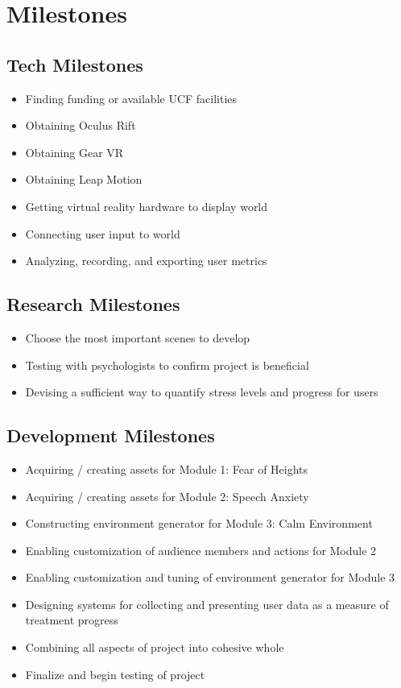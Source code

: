 \documentclass[a4paper,10pt]{article}
\begin{document}
	\pagebreak
	\section{Milestones}
	\subsection{Tech Milestones}
		\begin{itemize}
			\item Finding funding or available UCF facilities
			\item Obtaining Oculus Rift
			\item Obtaining Gear VR
			\item Obtaining Leap Motion
			\item Getting virtual reality hardware to display world
			\item Connecting user input to world
			\item Analyzing, recording, and exporting user metrics
		\end{itemize}
	\subsection{Research Milestones}
		\begin{itemize}
			\item Choose the most important scenes to develop
			\item Testing with psychologists to confirm project is beneficial
			\item Devising a sufficient way to quantify stress levels and progress for users
		\end{itemize}
	\subsection{Development Milestones}
		\begin{itemize}
			\item Acquiring / creating assets for Module 1: Fear of Heights
			\item Acquiring / creating assets for Module 2: Speech Anxiety
			\item Constructing environment generator for Module 3: Calm Environment
			\item Enabling customization of audience members and actions for Module 2
			\item Enabling customization and tuning of environment generator for Module 3
			\item Designing systems for collecting and presenting user data as a measure of treatment progress
			\item Combining all aspects of project into cohesive whole
			\item Finalize and begin testing of project
		\end{itemize}
\end{document}
